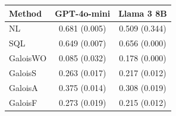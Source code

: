 \begin{tabular}{lcc}
\toprule
Method & GPT-4o-mini & Llama 3 8B \\
\midrule
NL & 0.681 (0.005) & 0.509 (0.344) \\
SQL & 0.649 (0.007) & 0.656 (0.000) \\
GaloisWO & 0.085 (0.032) & 0.178 (0.000) \\
GaloisS & 0.263 (0.017) & 0.217 (0.012) \\
GaloisA & 0.375 (0.014) & 0.308 (0.019) \\
GaloisF & 0.273 (0.019) & 0.215 (0.012) \\
\bottomrule
\end{tabular}